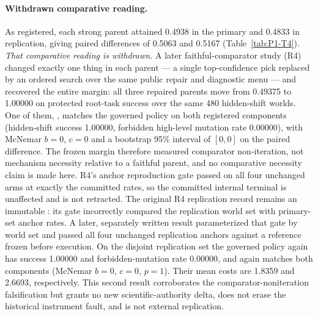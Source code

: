 \paragraph{Withdrawn comparative reading.}
As registered, each strong parent attained 0.4938 in the primary and 0.4833 in
replication, giving paired differences of 0.5063 and 0.5167
(Table~\ref{tab:P1-T4}). \emph{That comparative reading is withdrawn.} A later
faithful-comparator study (R4) changed exactly one thing in each parent --- a
single top-confidence pick replaced by an ordered search over the same public
repair and diagnostic menu --- and recovered the entire margin: all three
repaired parents move from 0.49375 to 1.00000 on protected root-task success
over the same 480 hidden-shift worlds. One of them,
, matches the governed policy on both
registered components (hidden-shift success 1.00000, forbidden high-level
mutation rate 0.00000), with McNemar $b = 0$, $c = 0$ and a bootstrap 95\%
interval of $[0,0]$ on the paired difference. The frozen margin therefore
measured comparator non-iteration, not mechanism necessity relative to a
faithful parent, and no comparative necessity claim is made here. R4's anchor
reproduction gate passed on all four unchanged arms at exactly the committed
rates, so the committed internal terminal is unaffected and is not retracted.
The original R4 replication record remains an immutable
: its gate
incorrectly compared the replication world set with primary-set anchor rates.
A later, separately written result parameterized that gate by world set and
passed all four unchanged replication anchors against a reference frozen before
execution. On the disjoint replication set the governed policy again has
success 1.00000 and forbidden-mutation rate 0.00000, and
 again matches both components
(McNemar $b=0$, $c=0$, $p=1$). Their mean costs are 1.8359 and 2.6693,
respectively. This second result corroborates the comparator-noniteration
falsification but grants no new scientific-authority delta, does not erase the
historical instrument fault, and is not external replication.



